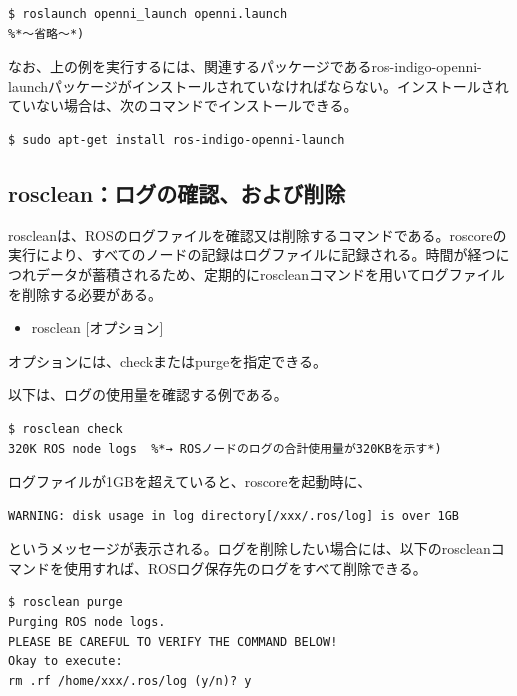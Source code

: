 \begin{lstlisting}[language=ROS]
$ roslaunch openni_launch openni.launch
%*〜省略〜*)
\end{lstlisting}

なお、上の例を実行するには、関連するパッケージであるros-indigo-openni-launchパッケージがインストールされていなければならない。インストールされていない場合は、次のコマンドでインストールできる。

\begin{lstlisting}[language=ROS]
$ sudo apt-get install ros-indigo-openni-launch
\end{lstlisting}

\subsection{rosclean：ログの確認、および削除}

roscleanは、ROSのログファイルを確認又は削除するコマンドである。roscoreの実行により、すべてのノードの記録はログファイルに記録される。時間が経つにつれデータが蓄積されるため、定期的にroscleanコマンドを用いてログファイルを削除する必要がある。


\begin{itemize}
\item  rosclean [オプション]
\end{itemize}
オプションには、checkまたはpurgeを指定できる。

以下は、ログの使用量を確認する例である。

\begin{lstlisting}[language=ROS]
$ rosclean check
320K ROS node logs  %*→ ROSノードのログの合計使用量が320KBを示す*)
\end{lstlisting}

ログファイルが1GBを超えていると、roscoreを起動時に、

\begin{lstlisting}[language=ROS]
WARNING: disk usage in log directory[/xxx/.ros/log] is over 1GB
\end{lstlisting}

というメッセージが表示される。ログを削除したい場合には、以下のroscleanコマンドを使用すれば、ROSログ保存先のログをすべて削除できる。

\begin{lstlisting}[language=ROS]
$ rosclean purge
Purging ROS node logs.
PLEASE BE CAREFUL TO VERIFY THE COMMAND BELOW!
Okay to execute:
rm .rf /home/xxx/.ros/log (y/n)? y
\end{lstlisting}

